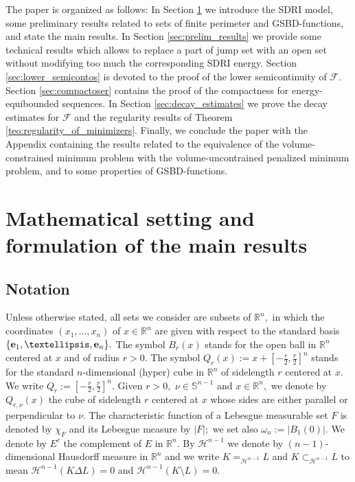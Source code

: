 \documentclass[reqno]{amsart}
\numberwithin{equation}{section}
\theoremstyle{plain}
\theoremstyle{definition}
\newcommand{\R}{\mathbb{R}}
\renewcommand{\S}{\mathbb{S}}
\newcommand{\cH}{\mathcal{H}}
\newcommand{\cF}{\mathcal{F}}
\newcommand{\e}{{\bf e}}
\begin{document}
The paper is organized as follows: In Section \ref{sec:main_results} we introduce the SDRI model, some preliminary results related to sets of finite perimeter and GSBD-functions, and state the main results. In Section \ref{sec:prelim_results} we
provide some technical results which allows to replace a part of jump set with an open set without modifying too much the corresponding SDRI energy. Section \ref{sec:lower_semicontos} is devoted to the proof of the lower semicontinuity of $\cF. $ Section \ref{sec:compactoser} contains the proof of the compactness for energy-equibounded sequences. In Section \ref{sec:decay_estimates} we prove the decay estimates for $\cF$ and the regularity results of Theorem \ref{teo:regularity_of_minimizers}. Finally, we conclude the paper with  the  Appendix containing the results related to the equivalence of  the volume-constrained minimum problem with the volume-uncontrained penalized minimum problem, and to some properties of GSBD-functions.



\section{Mathematical setting and formulation of the main results}\label{sec:main_results}

\subsection*{Notation} 


Unless otherwise stated, all sets we consider are subsets of $\R^n,$ in which the coordinates $(x_1,\ldots,x_n)$ of $x\in\R^n$ are given with respect to the standard basis $\{\e_1,\ldots, \e_n\}.$  The symbol $B_r(x)$  stands for the open ball in  $\R^n$  centered at $x$  and of radius $r>0.$  
The symbol $Q_r(x):=x+[-\frac{r}{2},\frac{r}{2}]^n$ stands for the standard $n$-dimensional (hyper) cube in $\R^n$ of sidelength $r$ centered at $x.$ We write $Q_r:=[-\frac{r}{2},\frac{r}{2}]^n.$ Given $r>0,$ $\nu\in\S^{n-1}$ and $x\in\R^n,$ we denote  by $ Q_{r,\nu}(x)$ the cube of sidelength $r$ centered at $x$ whose sides are either parallel or perpendicular to $\nu$.
The characteristic function of a Lebesgue measurable set $F$ is denoted by $\chi_F$ and its Lebesgue measure by $|F|;$ we set also $\omega_n:=|B_1(0)|.$  We denote by $E^c$ the complement of $E$ in $\R^n.$ 
By $\cH^{n-1}$ we denote by $(n-1)$-dimensional Hausdorff measure in $\R^n$ and we write $K=_{\cH^{n-1}} L$ and $K\subset_{\cH^{n-1}} L$ to mean $\cH^{n-1}(K\Delta L)=0$ and $\cH^{n-1}(K\setminus L)=0.$ 
\end{document}
